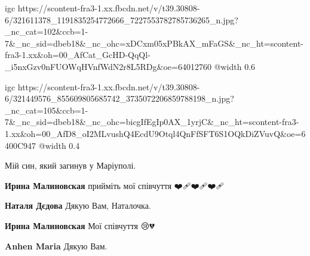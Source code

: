  
 
 
 
 

\begin{center}
\begin{minipage}{\textwidth}

\ifcmt
  igc https://scontent-fra3-1.xx.fbcdn.net/v/t39.30808-6/321611378_1191835254772666_7227553782785736265_n.jpg?_nc_cat=102&ccb=1-7&_nc_sid=dbeb18&_nc_ohc=xDCxm05xPBkAX_mFaGS&_nc_ht=scontent-fra3-1.xx&oh=00_AfCat_GcHD-QqQl-_i5nxGzv0nFUOWqHVnfWdN2r8L5RDg&oe=64012760
	@width 0.6
\fi

\end{minipage}
\end{center}


\begin{center}
\begin{minipage}{\textwidth}


\ifcmt
  igc https://scontent-fra3-1.xx.fbcdn.net/v/t39.30808-6/321449576_855609805685742_3735072206859788198_n.jpg?_nc_cat=105&ccb=1-7&_nc_sid=dbeb18&_nc_ohc=bicgIfEgIp0AX_1yrjC&_nc_ht=scontent-fra3-1.xx&oh=00_AfD8_oI2MLvushQ4EcdU9Otql4QnFfSFT6S1OQkDiZVuvQ&oe=6400C947
	@width 0.4
\fi


Мій син, який загинув у Маріуполі.

\end{minipage}
\end{center}

\begin{itemize} %
\textbf{Ирина Малиновская} прийміть мої співчуття ❤️🩹❤️🩹❤️🩹

\textbf{Наталя Дєдова} Дякую Вам, Наталочка.

\textbf{Ирина Малиновская} Мої співчуття 😢💔🙏

\textbf{Anhen Maria} Дякую Вам.
\end{itemize} %

